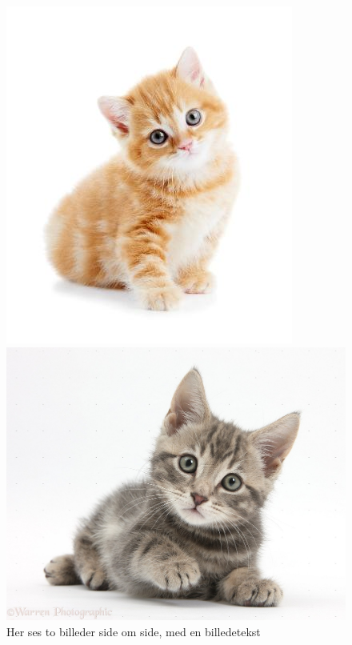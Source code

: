\documentclass[a4paper,11pt,danish,oneside]{article}
\begin{document}
\begin{figure}[h]
	\begin{center}
		\begin{minipage}{0.45\textwidth}
			\centering
			\includegraphics[scale=0.5]{3}
		\end{minipage}
		\begin{minipage}{0.45\textwidth}
			\centering
			\includegraphics[scale=0.2]{2}
		\end{minipage}
		\caption{Her ses to billeder side om side, med en billedetekst}
	\end{center}
\end{figure}
\end{document}
